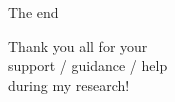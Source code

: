 \documentclass{beamer}
\begin{document}
\begin{frame}{The end}
\begin{center} \LARGE
Thank you all for your \\ 
support / guidance / help \\ 
during my research!
\end{center}
\end{frame}
\end{document}
